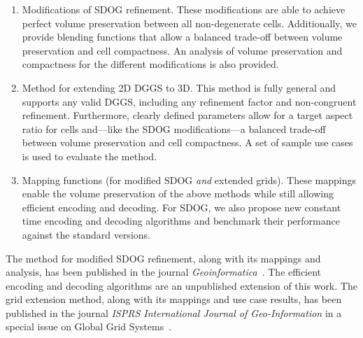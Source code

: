 \begin{enumerate}
	\item Modifications of SDOG refinement.
	These modifications are able to achieve perfect volume preservation between all non-degenerate cells.
	Additionally, we provide blending functions that allow a balanced trade-off between volume preservation and cell compactness.
	An analysis of volume preservation and compactness for the different modifications is also provided.
	
	\item Method for extending 2D DGGS to 3D.
	This method is fully general and supports any valid DGGS, including any refinement factor and non-congruent refinement.
	Furthermore, clearly defined parameters allow for a target aspect ratio for cells and---like the SDOG modifications---a balanced trade-off between volume preservation and cell compactness.
	A set of sample use cases is used to evaluate the method.
	
	\item Mapping functions (for modified SDOG \textit{and} extended grids).
	These mappings enable the volume preservation of the above methods while still allowing efficient encoding and decoding.
	For SDOG, we also propose new constant time encoding and decoding algorithms and benchmark their performance against the standard versions.
\end{enumerate}

The method for modified SDOG refinement, along with its mappings and analysis, has been published in the journal \textit{Geoinformatica}~\cite{ulmertoward2020}.
The efficient encoding and decoding algorithms are an unpublished extension of this work.
The grid extension method, along with its mappings and use case results, has been published in the journal \textit{ISPRS International Journal of Geo-Information} in a special issue on Global Grid Systems~\cite{mdpi}.


